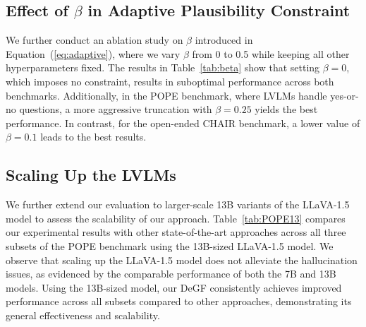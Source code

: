 \subsection{Effect of \texorpdfstring{$\beta$}{beta} in Adaptive Plausibility Constraint}
We further conduct an ablation study on $\beta$ introduced in Equation~(\ref{eq:adaptive}), where we vary $\beta$ from 0 to 0.5 while keeping all other hyperparameters fixed. The results in Table~\ref{tab:beta} show that setting $\beta=0$, which imposes no constraint, results in suboptimal performance across both benchmarks. Additionally, in the POPE benchmark, where LVLMs handle yes-or-no questions, a more aggressive truncation with $\beta=0.25$ yields the best performance. In contrast, for the open-ended CHAIR benchmark, a lower value of $\beta=0.1$ leads to the best results.



        
\subsection{Scaling Up the LVLMs}
We further extend our evaluation to larger-scale 13B variants of the LLaVA-1.5 model to assess the scalability of our approach. Table~\ref{tab:POPE13} compares our experimental results with other state-of-the-art approaches across all three subsets of the POPE benchmark using the 13B-sized LLaVA-1.5 model. We observe that scaling up the LLaVA-1.5 model does not alleviate the hallucination issues, as evidenced by the comparable performance of both the 7B and 13B models. Using the 13B-sized model, our DeGF consistently achieves improved performance across all subsets compared to other approaches, demonstrating its general effectiveness and scalability.


